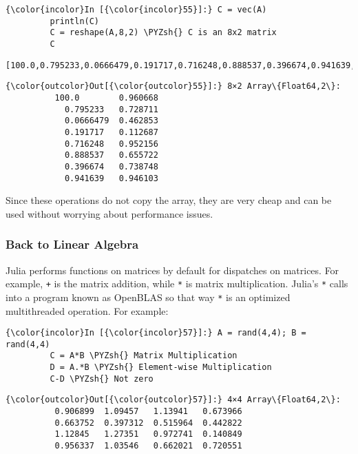 \documentclass[11pt]{article}
\def\PYZsh{\char`\#}
\begin{document}
    \begin{Verbatim}[commandchars=\\\{\}]
{\color{incolor}In [{\color{incolor}55}]:} C = vec(A)
         println(C)
         C = reshape(A,8,2) \PYZsh{} C is an 8x2 matrix
         C
\end{Verbatim}

    \begin{Verbatim}[commandchars=\\\{\}]
[100.0,0.795233,0.0666479,0.191717,0.716248,0.888537,0.396674,0.941639,0.960668,0.728711,0.462853,0.112687,0.952156,0.655722,0.738748,0.946103]

    \end{Verbatim}

            \begin{Verbatim}[commandchars=\\\{\}]
{\color{outcolor}Out[{\color{outcolor}55}]:} 8×2 Array\{Float64,2\}:
          100.0        0.960668
            0.795233   0.728711
            0.0666479  0.462853
            0.191717   0.112687
            0.716248   0.952156
            0.888537   0.655722
            0.396674   0.738748
            0.941639   0.946103
\end{Verbatim}
        
    Since these operations do not copy the array, they are very cheap and
can be used without worrying about performance issues.

    \subsubsection{Back to Linear Algebra}\label{back-to-linear-algebra}

Julia performs functions on matrices by default for dispatches on
matrices. For example, \texttt{+} is the matrix addition, while
\texttt{*} is matrix multiplication. Julia's \texttt{*} calls into a
program known as OpenBLAS so that way \texttt{*} is an optimized
multithreaded operation. For example:

    \begin{Verbatim}[commandchars=\\\{\}]
{\color{incolor}In [{\color{incolor}57}]:} A = rand(4,4); B = rand(4,4)
         C = A*B \PYZsh{} Matrix Multiplication
         D = A.*B \PYZsh{} Element-wise Multiplication
         C-D \PYZsh{} Not zero 
\end{Verbatim}

            \begin{Verbatim}[commandchars=\\\{\}]
{\color{outcolor}Out[{\color{outcolor}57}]:} 4×4 Array\{Float64,2\}:
          0.906899  1.09457   1.13941   0.673966
          0.663752  0.397312  0.515964  0.442822
          1.12845   1.27351   0.972741  0.140849
          0.956337  1.03546   0.662021  0.720551
\end{Verbatim}
        
\end{document}
